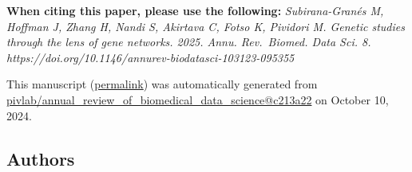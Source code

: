 { \textbf{When citing this paper, please use the following:}
\emph{Subirana-Granés M, Hoffman J, Zhang H, Nandi S, Akirtava C, Fotso K, Pividori M. Genetic studies through the lens of gene networks. 2025. Annu. Rev.~Biomed. Data Sci. 8. https://doi.org/10.1146/annurev-biodatasci-103123-095355}}

This manuscript
(\href{https://pivlab.github.io/annual_review_of_biomedical_data_science/v/c213a22b1a038348f3a47b835a50d5d5e35f8e7b/}{permalink})
was automatically generated
from \href{https://github.com/pivlab/annual_review_of_biomedical_data_science/tree/c213a22b1a038348f3a47b835a50d5d5e35f8e7b}{pivlab/annual\_review\_of\_biomedical\_data\_science@c213a22}
on October 10, 2024.

\hypertarget{authors}{%
\subsection{Authors}\label{authors}}

